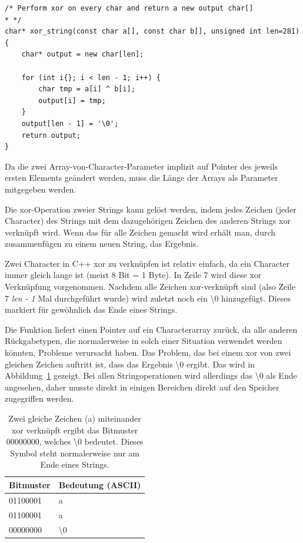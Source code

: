 \documentclass[]{article}
\begin{document}
\begin{lstlisting}
/* Perform xor on every char and return a new output char[]
* */
char* xor_string(const char a[], const char b[], unsigned int len=281) {
	char* output = new char[len];
	
	for (int i{}; i < len - 1; i++) {
		char tmp = a[i] ^ b[i];
		output[i] = tmp;
	}
	output[len - 1] = '\0';
	return output;
}
\end{lstlisting}

Da die zwei Array-von-Character-Parameter implizit auf Pointer des jeweils ersten Elements geändert werden, muss die Länge der Arrays als Parameter mitgegeben werden.

Die xor-Operation zweier Strings kann gelöst werden, indem jedes Zeichen (jeder Character) des Strings mit dem dazugehörigen Zeichen des anderen Strings xor verknüpft wird. Wenn das für alle Zeichen gemacht wird erhält man, durch zusammenfügen zu einem neuen String, das Ergebnis.

Zwei Character in C++ xor zu verknüpfen ist relativ einfach, da ein Character immer gleich lange ist (meist 8 Bit = 1 Byte). In Zeile 7 wird diese xor Verknüpfung vorgenommen. Nachdem alle Zeichen xor-verknüpft sind (also Zeile 7 \textit{len - 1} Mal durchgeführt wurde) wird zuletzt noch ein \textbackslash 0 hinzugefügt. Dieses markiert für gewöhnlich das Ende eines Strings.

Die Funktion liefert einen Pointer auf ein Characterarray zurück, da alle anderen Rückgabetypen, die normalerweise in solch einer Situation verwendet werden könnten, Probleme verursacht haben. Das Problem, das bei einem xor von zwei gleichen Zeichen auftritt ist, dass das Ergebnis \textbackslash 0 ergibt. Das wird in Abbildung~\ref{fig:xor_gleiches_zeichen} gezeigt. Bei allen Stringoperationen wird allerdings das \textbackslash 0 als Ende angesehen, daher musste direkt in einigen Bereichen direkt auf den Speicher zugegriffen werden.

\begin{table}[]
	\centering
	\begin{tabular}{l|l}
		Bitmuster  & Bedeutung (ASCII)\\ \hline
		01100001   & a                \\
		01100001   & a                \\ \hline
		00000000   & \textbackslash 0 \\
	\end{tabular}
	\caption{Zwei gleiche Zeichen (a) miteinander xor verknüpft ergibt das Bitmuster 00000000, welches \textbackslash 0 bedeutet. Dieses Symbol steht normalerweise nur am Ende eines Strings.}
	\label{fig:xor_gleiches_zeichen}
\end{table}
\end{document}
